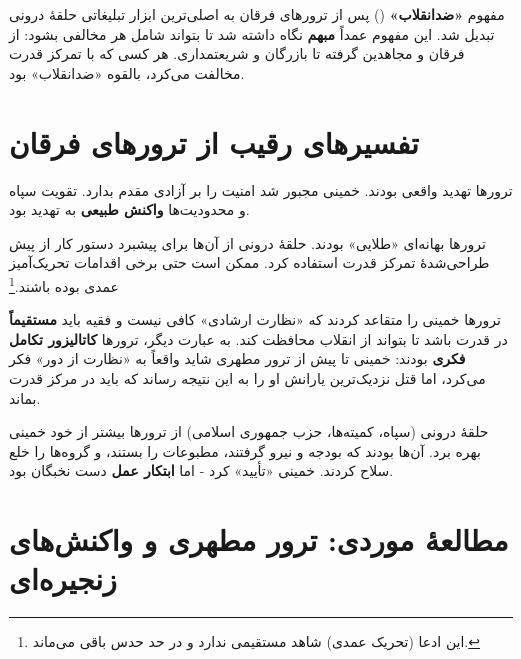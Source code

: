 \documentclass[12pt,a4paper]{book}
\newcommand{\keyword}[1]{\textbf{\textcolor{cPrimary}{#1}}}
\begin{document}
\begin{warningBox}
مفهوم \keyword{«ضدانقلاب»} () پس از ترورهای فرقان به اصلی‌ترین ابزار تبلیغاتی حلقهٔ درونی تبدیل شد. این مفهوم عمداً \keyword{مبهم} نگاه داشته شد تا بتواند شامل هر مخالفی بشود: از فرقان و مجاهدین گرفته تا بازرگان و شریعتمداری. هر کسی که با تمرکز قدرت مخالفت می‌کرد، بالقوه «ضدانقلاب» بود.
\end{warningBox}

\section{تفسیرهای رقیب از ترورهای فرقان}

\begin{principleBox}
\begin{description}[style=nextline, font=\bfseries\color{cPrimary}]
    \item[تز ۱ (صداقت + اجبار)]
    ترورها تهدید واقعی بودند. خمینی مجبور شد امنیت را بر آزادی مقدم بدارد. تقویت سپاه و محدودیت‌ها \keyword{واکنش طبیعی} به تهدید بود.

    \item[تز ۲ (خدعه)]
    ترورها بهانه‌ای «طلایی» بودند. حلقهٔ درونی از آن‌ها برای پیشبرد دستور کار از پیش طراحی‌شدهٔ تمرکز قدرت استفاده کرد. ممکن است حتی برخی اقدامات تحریک‌آمیز عمدی بوده باشند.\footnote{این ادعا (تحریک عمدی) شاهد مستقیمی ندارد و در حد حدس باقی می‌ماند.}

    \item[تز ۳ (تکامل)]
    ترورها خمینی را متقاعد کردند که «نظارت ارشادی» کافی نیست و فقیه باید \keyword{مستقیماً} در قدرت باشد تا بتواند از انقلاب محافظت کند. به عبارت دیگر، ترورها \keyword{کاتالیزور تکامل فکری} بودند: خمینی تا پیش از ترور مطهری شاید واقعاً به «نظارت از دور» فکر می‌کرد، اما قتل نزدیک‌ترین یارانش او را به این نتیجه رساند که باید در مرکز قدرت بماند.

    \item[تز ۴ (فشار نخبگان)]
    حلقهٔ درونی (سپاه، کمیته‌ها، حزب جمهوری اسلامی) از ترورها بیشتر از خود خمینی بهره برد. آن‌ها بودند که بودجه و نیرو گرفتند، مطبوعات را بستند، و گروه‌ها را خلع سلاح کردند. خمینی «تأیید» کرد - اما \keyword{ابتکار عمل} دست نخبگان بود.
\end{description}
\end{principleBox}

\section{مطالعهٔ موردی: ترور مطهری و واکنش‌های زنجیره‌ای}
\end{document}
